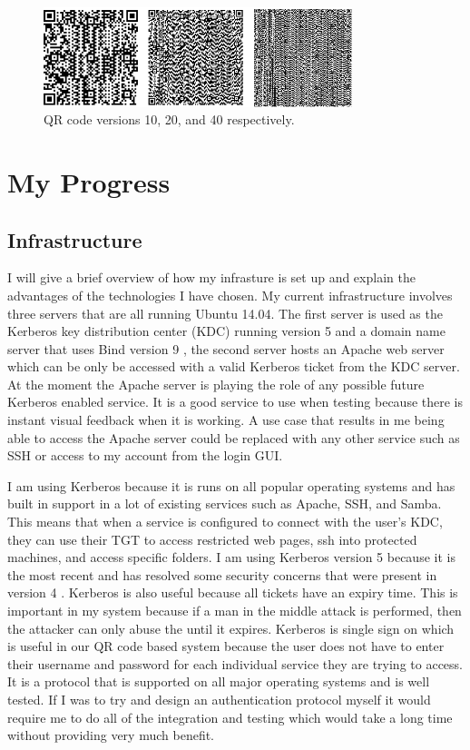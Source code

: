 \documentclass[]{report}   %
\begin{document}
\begin{figure}[H]
\centering
\includegraphics[width=9cm]{QRCodes.png}
\caption{QR code versions 10, 20, and 40 respectively.}
\end{figure}

\section{My Progress}
\subsection{Infrastructure} 
I will give a brief overview of how my infrasture is set up and explain the advantages of the technologies I have chosen. My current infrastructure involves three servers that are all running Ubuntu 14.04. The first server is used as the Kerberos key distribution center (KDC) running version 5 and a domain name server that uses Bind version 9 \cite{Bind}, the second server hosts an Apache web server which can be only be accessed with a valid Kerberos ticket from the KDC server. At the moment the Apache server is playing the role of any possible future Kerberos enabled service. It is a good service to use when testing because there is instant visual feedback when it is working. A use case that results in me being able to access the Apache server could be replaced with any other service such as SSH or access to my account from the login GUI.

I am using Kerberos because it is runs on all popular operating systems and has built in support in a lot of existing services such as Apache, SSH, and Samba. This means that when a service is configured to connect with the user's KDC, they can use their TGT to access restricted web pages, ssh into protected machines, and access specific folders. I am using Kerberos version 5 because it is the most recent and has resolved some security concerns that were present in version 4 \cite{KerbUpdate}. Kerberos is also useful because all tickets have an expiry time. This is important in my system because if a man in the middle attack is performed, then the attacker can only abuse the until it expires. Kerberos is single sign on which is useful in our QR code based system because the user does not have to enter their username and password for each individual service they are trying to access. It is a protocol that is supported on all major operating systems and is well tested. If I was to try and design an authentication protocol myself it would require me to do all of the integration and testing which would take a long time without providing very much benefit.
\end{document}
